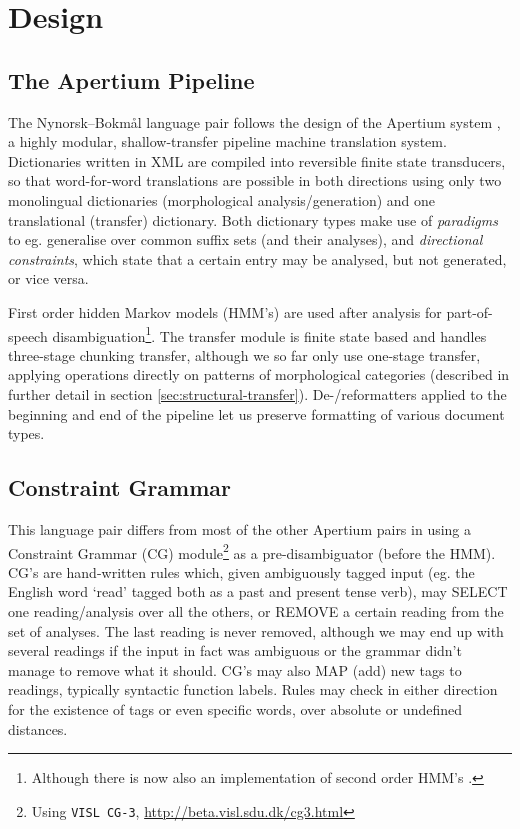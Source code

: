 \documentclass[11pt]{article}
\begin{document}
\section{Design}
 \label{sec:design}
\subsection{The Apertium Pipeline}
 The Nynorsk–Bokmål language pair follows the design of the Apertium
 system
 \citep{corbi05oss}, a highly modular, shallow-transfer pipeline
 machine translation system. Dictionaries written in XML are compiled
 into reversible finite state transducers, so that word-for-word
 translations are possible in both directions using only two
 monolingual dictionaries (morphological analysis/generation) and one
 translational (transfer) dictionary. Both dictionary types make use of
 \emph{paradigms} to eg. generalise over common suffix sets (and
 their analyses), and \emph{directional constraints}, which state that
 a certain entry may be analysed, but not generated, or vice versa.

 First order hidden Markov models (HMM's) are used after analysis for
 part-of-speech disambiguation\footnote{Although there is now also an
   implementation of second order HMM's \citep{sheikh2009trigram}. }.
 The transfer module is finite state based and handles three-stage
 chunking transfer, although we so far only use one-stage transfer,
 applying operations directly on patterns of morphological categories
 (described in further detail in section
 \ref{sec:structural-transfer}).  De-/reformatters applied to the
 beginning and end of the pipeline let us preserve formatting of
 various document types.

\subsection{Constraint Grammar}
This language pair differs from most of the other Apertium pairs in
using a Constraint Grammar (CG) module\footnote{Using {\tt VISL CG-3},
  \href{http://beta.visl.sdu.dk/cg3.html}{http://beta.visl.sdu.dk/cg3.html}
} as a pre-disambiguator (before the HMM). CG's
\citep{karlsson1990cgf} are hand-written rules which, given
ambiguously tagged input (eg. the English word `read' tagged both as a
past and present tense verb), may SELECT one reading/analysis over all
the others, or REMOVE a certain reading from the set of analyses. The
last reading is never removed, although we may end up with several
readings if the input in fact was ambiguous or the grammar didn't
manage to remove what it should. CG's may also MAP (add) new tags to
readings, typically syntactic function labels. Rules may check in
either direction for the existence of tags or even specific words,
over absolute or undefined distances.
\end{document}
